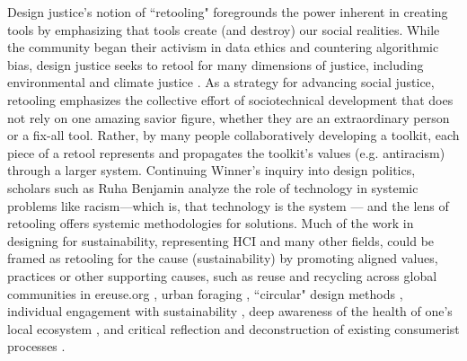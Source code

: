 Design justice's notion of ``retooling" foregrounds the power inherent in creating tools by emphasizing that tools create (and destroy) our social realities. While the community began their activism in data ethics and countering algorithmic bias, design justice seeks to retool for many dimensions of justice, including environmental and climate justice \todo{[153]}. As a strategy for advancing social justice, retooling emphasizes the collective effort of sociotechnical development that does not rely on one amazing savior figure, whether they are an extraordinary person or a fix-all tool. Rather, by many people collaboratively developing a toolkit, each piece of a retool represents and propagates the toolkit's values (e.g. antiracism) through a larger system. Continuing Winner's inquiry into design politics, scholars such as Ruha Benjamin analyze the role of technology in systemic problems like racism---which is, that technology is the system \cite{benjamin_race_2019} --- and the lens of retooling offers systemic methodologies for solutions. Much of the work in designing for sustainability, representing HCI and many other fields, could be framed as retooling for the cause (sustainability) by promoting aligned values, practices or other supporting causes, such as reuse and recycling across global communities in ereuse.org \todo{[51]}, urban foraging \todo{[38]}, ``circular" design methods \todo{[141]}, individual engagement with sustainability \todo{[39,41]}, deep awareness of the health of one's local ecosystem \todo{[8,73,78,149]}, and critical reflection and deconstruction of existing consumerist processes \todo{[19,101,107,117]}.

